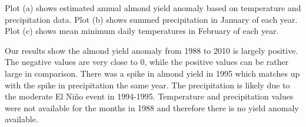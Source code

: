 \documentclass[
]{article}
\begin{document}
Plot (a) shows estimated annual almond yield anomaly based on
temperature and precipitation data. Plot (b) shows summed precipitation
in January of each year. Plot (c) shows mean minimum daily temperatures
in February of each year.

Our results show the almond yield anomaly from 1988 to 2010 is largely
positive. The negative values are very close to 0, while the positive
values can be rather large in comparison. There was a spike in almond
yield in 1995 which matches up with the spike in precipitation the same
year. The precipitation is likely due to the moderate El Niño event in
1994-1995. Temperature and precipitation values were not available for
the months in 1988 and therefore there is no yield anomaly available.
\end{document}
